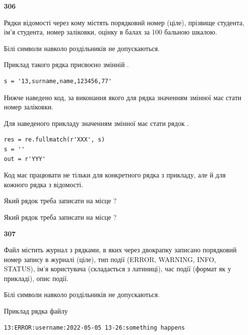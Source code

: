 \newpage

{\begin {center}\textbf{ 306}\end {center}}\par
Рядки відомості через кому містять порядковий номер (ціле), пріз\-ви\-ще студен\-та, ім'я студента, номер заліковки, оцінку в балах за 100 бальною шкалою.

Білі символи навколо роздільників не допускаються.

Приклад такого рядка присвоєно змінній .



\begin{verbatim}
s = '13,surname,name,123456,77'
\end{verbatim}


Нижче наведено код, за виконання якого для рядка  значенням змінної  має стати номер заліковки.

Для наведеного прикладу значенням змінної  має стати рядок  .



\begin{verbatim}
res = re.fullmatch(r'XXX', s)
s = ''
out = r'YYY'
\end{verbatim}


Код має працювати не тільки для конкретного рядка з прикладу, але й для кожного рядка з відомості.




Який рядок треба записати на місце  ?\par
\vspace{5mm}


Який рядок треба записати на місце  ?\par


\newpage

{\begin {center}\textbf{ 307}\end {center}}\par
Файл  містить журнал з рядками, в яких через двокрапку записано поряд\-ко\-вий номер запису в журналі (ціле), тип події (ERROR, WARNING, INFO, STATUS), ім'я користувача (складається з латиниці), час події (фор\-мат як у прикладі), опис події.

Білі символи навколо роздільників не допускаються.

Приклад рядка файлу



\begin{verbatim}
13:ERROR:username:2022-05-05 13-26:something happens
\end{verbatim}


